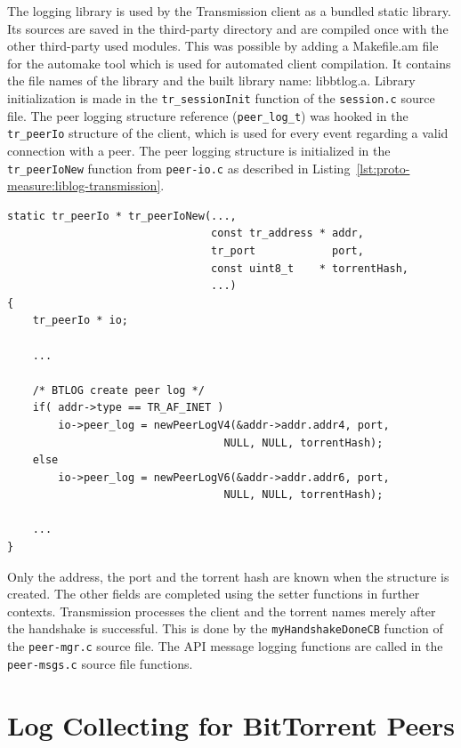 The logging library is used by the Transmission client as a bundled static
library. Its sources are saved in the third-party directory and are compiled
once with the other third-party used modules. This was possible by adding a
Makefile.am file for the automake tool which is used for automated client
compilation. It contains the file names of the library and the built library
name: libbtlog.a. Library initialization is made in the
\texttt{tr\_sessionInit}
function of the \texttt{session.c} source file. The peer logging structure reference
(\texttt{peer\_log\_t}) was hooked in the \texttt{tr\_peerIo} structure of the
client, which is used for every event regarding a valid connection with a
peer. The peer logging structure is initialized in the \texttt{tr\_peerIoNew}
function from \texttt{peer-io.c} as described in
Listing~\ref{lst:proto-measure:liblog-transmission}.

\lstset{language=C,caption=Library Logging in
Transmission,label=lst:proto-measure:liblog-transmission}
\begin{lstlisting}
static tr_peerIo * tr_peerIoNew(...,
                                const tr_address * addr,
                                tr_port            port,
                                const uint8_t    * torrentHash,
                                ...)
{
    tr_peerIo * io;

    ...

    /* BTLOG create peer log */
    if( addr->type == TR_AF_INET )
        io->peer_log = newPeerLogV4(&addr->addr.addr4, port, 
                                  NULL, NULL, torrentHash);
    else
        io->peer_log = newPeerLogV6(&addr->addr.addr6, port,
                                  NULL, NULL, torrentHash);

    ...
}
\end{lstlisting}

Only the address, the port and the torrent hash are known when the structure
is created. The other fields are completed using the setter functions in
further contexts. Transmission processes the client and the torrent names
merely after the handshake is successful. This is done by the
\texttt{myHandshakeDoneCB} function of the \texttt{peer-mgr.c} source file.
The API message logging functions are called in the \texttt{peer-msgs.c}
source file functions.

\section{Log Collecting for BitTorrent Peers}
\label{sec:proto-measure:log-collect}

